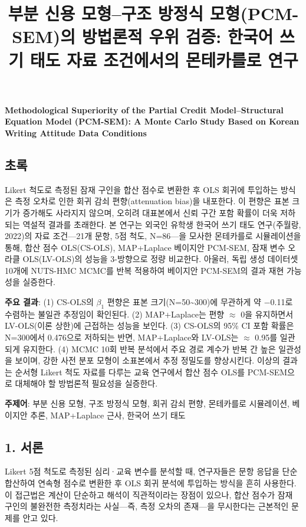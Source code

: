 \documentclass[a4paper,10pt]{oblivoir}
\begin{document}
\title{부분 신용 모형--구조 방정식 모형(PCM-SEM)의 방법론적 우위 검증: 한국어 쓰기 태도 자료 조건에서의 몬테카를로 연구}
\maketitle

\textbf{Methodological Superiority of the Partial Credit Model--Structural Equation Model (PCM-SEM): A Monte Carlo Study Based on Korean Writing Attitude Data Conditions}


\subsection{초록}

Likert 척도로 측정된 잠재 구인을 합산 점수로 변환한 후 OLS 회귀에 투입하는 방식은 측정 오차로 인한 회귀 감쇠 편향(attenuation bias)을 내포한다. 이 편향은 표본 크기가 증가해도 사라지지 않으며, 오히려 대표본에서 신뢰 구간 포함 확률이 더욱 저하되는 역설적 결과를 초래한다. 본 연구는 외국인 유학생 한국어 쓰기 태도 연구(주월랑, 2022)의 자료 조건—21개 문항, 5점 척도, N=86—을 모사한 몬테카를로 시뮬레이션을 통해, 합산 점수 OLS(CS-OLS), MAP+Laplace 베이지안 PCM-SEM, 잠재 변수 오라클 OLS(LV-OLS)의 성능을 3-방향으로 정량 비교한다. 아울러, 독립 생성 데이터셋 10개에 NUTS-HMC MCMC를 반복 적용하여 베이지안 PCM-SEM의 결과 재현 가능성을 실증한다.

\textbf{주요 결과}: (1) CS-OLS의 $\beta_1$ 편향은 표본 크기(N=50\~{}300)에 무관하게 약 \ensuremath{-}0.11로 수렴하는 불일관 추정임이 확인된다. (2) MAP+Laplace는 편향 \ensuremath{\approx} 0을 유지하면서 LV-OLS(이론 상한)에 근접하는 성능을 보인다. (3) CS-OLS의 95\% CI 포함 확률은 N=300에서 0.476으로 저하되는 반면, MAP+Laplace와 LV-OLS는 \ensuremath{\approx} 0.95를 일관되게 유지한다. (4) MCMC 10회 반복 분석에서 주요 경로 계수가 반복 간 높은 일관성을 보이며, 강한 사전 분포 모형이 소표본에서 추정 정밀도를 향상시킨다. 이상의 결과는 순서형 Likert 척도 자료를 다루는 교육 연구에서 합산 점수 OLS를 PCM-SEM으로 대체해야 할 방법론적 필요성을 실증한다.

\textbf{주제어}: 부분 신용 모형, 구조 방정식 모형, 회귀 감쇠 편향, 몬테카를로 시뮬레이션, 베이지안 추론, MAP+Laplace 근사, 한국어 쓰기 태도


\subsection{1. 서론}

Likert 5점 척도로 측정된 심리·교육 변수를 분석할 때, 연구자들은 문항 응답을 단순 합산하여 연속형 점수로 변환한 후 OLS 회귀 분석에 투입하는 방식을 흔히 사용한다. 이 접근법은 계산이 단순하고 해석이 직관적이라는 장점이 있으나, 합산 점수가 잠재 구인의 불완전한 측정치라는 사실—즉, 측정 오차의 존재—을 무시한다는 근본적인 문제를 안고 있다.
\end{document}
